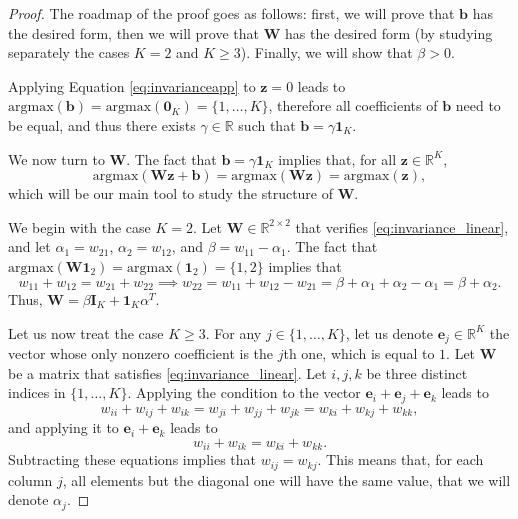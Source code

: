 \documentclass[10pt,a4paper]{amsart}
\newcommand{\bI}{\mathbf{I}}%
\newcommand{\bW}{\mathbf{W}}%
\newcommand{\bb}{\mathbf{b}}%
\newcommand{\be}{\mathbf{e}}%
\newcommand{\bun}{\mathbf{1}}%
\newcommand{\bz}{\mathbf{z}}%
\begin{document}
\begin{proof}
The roadmap of the proof goes as follows: first, we will prove that $\bb$ has the desired form, then we will prove that $\bW$ has the desired form (by studying separately the cases $K=2$ and $K \geq 3$). Finally, we will show that $\beta>0$.



Applying Equation \eqref{eq:invarianceapp} to $\bz=0$ leads to $\text{argmax}(\bb)= \text{argmax}(\boldsymbol{0}_K)= \{1, \ldots, K \} $, therefore all coefficients of $\bb$ need to be equal, and thus there exists $\gamma \in \mathbb{R}$ such that $\bb = \gamma \bun_K$.

We now turn to $\bW$. The fact that $\bb = \gamma \bun_K$ implies that, for all $\bz \in \mathbb{R}^K$, 
\begin{equation}
\label{eq:invariance_linear}
    \text{argmax}(\bW \bz+\bb)= \text{argmax}(\bW \bz) = \text{argmax}(\bz),
\end{equation}
which will be our main tool to study the structure of $\bW$.

We begin with the case $K=2$. Let $\bW \in \mathbb{R}^{2 \times 2}$ that verifies \eqref{eq:invariance_linear}, and let $\alpha_1 = w_{21}$, $\alpha_2 = w_{12}$, and $\beta = w_{11}- \alpha_1$. The fact that $\text{argmax}(\bW \bun_2) = \text{argmax}(\bun_2)= \{1,2\}$ implies that
\begin{equation}
    w_{11} + w_{12} = w_{21} +w_{22} \implies w_{22} = w_{11} + w_{12} - w_{21} = \beta + \alpha_1 + \alpha_2 - \alpha_1 = \beta + \alpha_2.
\end{equation}
Thus, $\bW = \beta \bI_K + \bun_K \alpha ^T$. 




Let us now treat the case $K\geq 3$. For any $j \in \{1,\ldots,K\}$, let us denote $\be_j\in \mathbb{R}^K$ the vector whose only nonzero coefficient is the $j$th one, which is equal to $1$. Let $\bW$ be a matrix that satisfies \eqref{eq:invariance_linear}. Let $i,j,k$ be three distinct indices in $\{1, \ldots, K\}$. Applying the condition to the vector $\be_i + \be_j + \be_k$ leads to
\begin{equation}
    w_{ii} + w_{ij} + w_{ik} = w_{ji} + w_{jj} + w_{jk} = w_{ki} + w_{kj} + w_{kk},
\end{equation}
and applying it to  $\be_i + \be_k$ leads to
\begin{equation}
    w_{ii} + w_{ik} = w_{ki} + w_{kk}.
\end{equation}
Subtracting these equations implies that $w_{ij} = w_{kj}$. This means that, for each column $j$, all elements but the diagonal one will have the same value, that we will denote $\alpha_j$. 


\end{proof}
\end{document}
